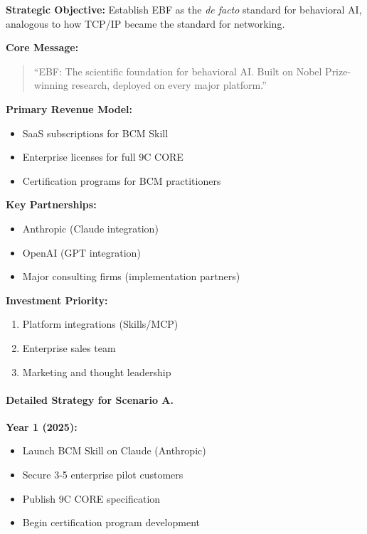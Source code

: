 \begin{tcolorbox}[colback=green!5!white, colframe=green!75!black,
    title=Strategic Position A: The Behavioral Standard]

\textbf{Strategic Objective:}
Establish EBF as the \textit{de facto} standard for behavioral AI, analogous to how TCP/IP became the standard for networking.

\textbf{Core Message:}
\begin{quote}
``EBF: The scientific foundation for behavioral AI. Built on Nobel Prize-winning research, deployed on every major platform.''
\end{quote}

\textbf{Primary Revenue Model:}
\begin{itemize}[nosep]
\item SaaS subscriptions for BCM Skill
\item Enterprise licenses for full 9C CORE
\item Certification programs for BCM practitioners
\end{itemize}

\textbf{Key Partnerships:}
\begin{itemize}[nosep]
\item Anthropic (Claude integration)
\item OpenAI (GPT integration)
\item Major consulting firms (implementation partners)
\end{itemize}

\textbf{Investment Priority:}
\begin{enumerate}[nosep]
\item Platform integrations (Skills/MCP)
\item Enterprise sales team
\item Marketing and thought leadership
\end{enumerate}

\end{tcolorbox}

\paragraph{Detailed Strategy for Scenario A.}

\textbf{Year 1 (2025):}
\begin{itemize}
\item Launch BCM Skill on Claude (Anthropic)
\item Secure 3-5 enterprise pilot customers
\item Publish 9C CORE specification
\item Begin certification program development
\end{itemize}

